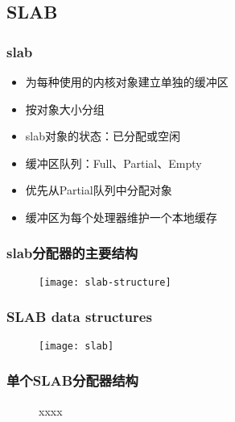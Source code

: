 \subsection{SLAB} %
\begin{frame}[plain,t]    
    \frametitle{slab}
    \begin{itemize}
        \item 为每种使用的内核对象建立单独的缓冲区
        \item 按对象大小分组
        \item slab对象的状态：已分配或空闲
        \item 缓冲区队列：Full、Partial、Empty
        \item 优先从Partial队列中分配对象
        \item 缓冲区为每个处理器维护一个本地缓存
    \end{itemize}
\end{frame}
\begin{frame}[plain,t]    
    \frametitle{slab分配器的主要结构}
    \begin{figure}
        \centering
        \texttt{[image: slab-structure]}
    \end{figure}
\end{frame}
\begin{frame}[plain,t]    
    \frametitle{SLAB data structures}
    \begin{figure}
        \centering
        \texttt{[image: slab]}
    \end{figure}
\end{frame}
\begin{frame}[plain,t]    
    \frametitle{单个SLAB分配器结构}
    \begin{figure}
        \centering
        \caption{xxxx}
    \end{figure}
\end{frame}

